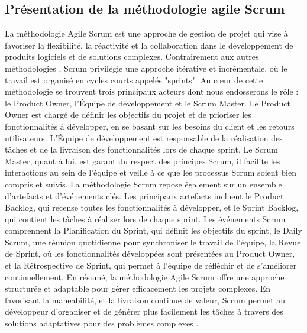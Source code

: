 \subsection{Présentation de la méthodologie agile Scrum}
La méthodologie Agile Scrum est une approche de gestion de projet qui vise à favoriser la flexibilité, la réactivité et la collaboration dans le développement de produits logiciels et de solutions complexes. Contrairement aux autres méthodologies , Scrum privilégie une approche itérative et incrémentale, où le travail est organisé en cycles courts appelés "sprints"\cite{permana2015scrum}.
	Au cœur de cette méthodologie se trouvent trois principaux acteurs dont nous endosserons le rôle : le Product Owner, l'Équipe de développement et le Scrum Master. Le Product Owner est chargé de définir les objectifs du projet et de prioriser les fonctionnalités à développer, en se basant sur les besoins du client et les retours utilisateurs. L'Équipe de développement est responsable de la réalisation des tâches et de la livraison des fonctionnalités lors de chaque sprint. Le Scrum Master, quant à lui, est garant du respect des principes Scrum, il facilite les interactions au sein de l'équipe et veille à ce que les processus Scrum soient bien compris et suivis.
La méthodologie Scrum repose également sur un ensemble d'artefacts et d'événements clés. Les principaux artefacts incluent le Product Backlog, qui recense toutes les fonctionnalités à développer, et le Sprint Backlog, qui contient les tâches à réaliser lors de chaque sprint. Les événements Scrum comprennent la Planification du Sprint, qui définit les objectifs du sprint, le Daily Scrum, une réunion quotidienne pour synchroniser le travail de l'équipe, la Revue de Sprint, où les fonctionnalités développées sont présentées au Product Owner, et la Rétrospective de Sprint, qui permet à l'équipe de réfléchir et de s'améliorer continuellement.
En résumé, la méthodologie Agile Scrum offre une approche structurée et adaptable pour gérer efficacement les projets complexes. En favorisant la maneabilité, et la livraison continue de valeur, Scrum permet au développeur d'organiser et de générer plus facilement les tâches à travers des solutions adaptatives pour des problèmes complexes \cite{schwaber2011scrum}.
	
	
	
